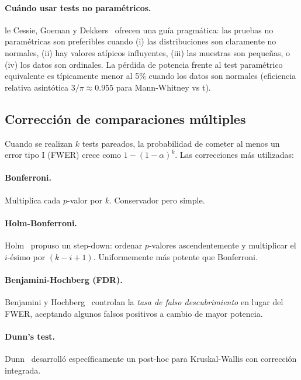 \documentclass[12pt,a4paper,oneside]{book}
\begin{document}
\paragraph{Cuándo usar tests no paramétricos.} le Cessie, Goeman y Dekkers~\cite{leCessie2020} ofrecen una guía pragmática: las pruebas no paramétricas son preferibles cuando (i) las distribuciones son claramente no normales, (ii) hay valores atípicos influyentes, (iii) las muestras son pequeñas, o (iv) los datos son ordinales. La pérdida de potencia frente al test paramétrico equivalente es típicamente menor al 5\% cuando los datos son normales (eficiencia relativa asintótica $3/\pi \approx 0.955$ para Mann-Whitney vs t).

\subsection{Corrección de comparaciones múltiples}

Cuando se realizan $k$ tests pareados, la probabilidad de cometer al menos un error tipo I (FWER) crece como $1-(1-\alpha)^k$. Las correcciones más utilizadas:

\paragraph{Bonferroni.} Multiplica cada $p$-valor por $k$. Conservador pero simple.

\paragraph{Holm-Bonferroni.} Holm~\cite{Holm1979} propuso un step-down: ordenar $p$-valores ascendentemente y multiplicar el $i$-ésimo por $(k-i+1)$. Uniformemente más potente que Bonferroni.

\paragraph{Benjamini-Hochberg (FDR).} Benjamini y Hochberg~\cite{Benjamini1995} controlan la \emph{tasa de falso descubrimiento} en lugar del FWER, aceptando algunos falsos positivos a cambio de mayor potencia.

\paragraph{Dunn's test.} Dunn~\cite{Dunn1964} desarrolló específicamente un post-hoc para Kruskal-Wallis con corrección integrada.
\end{document}
